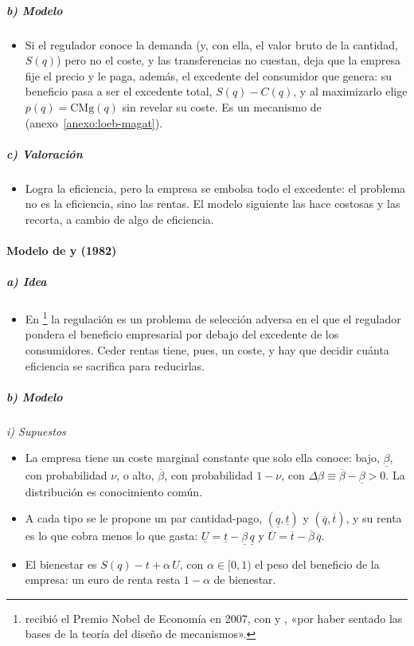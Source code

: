 \documentclass[11pt]{article}
\begin{document}
\subparagraph{b) Modelo}

\begin{itemize}
\item Si el regulador conoce la demanda (y, con ella, el valor bruto de la cantidad, $S(q)$) pero no el coste, y las transferencias no cuestan, deja que la empresa fije el precio y le paga, además, el excedente del consumidor que genera: su beneficio pasa a ser el excedente total, $S(q)-C(q)$, y al maximizarlo elige $p(q)=\mathrm{CMg}(q)$ sin revelar su coste. Es un mecanismo de   (anexo~\ref{anexo:loeb-magat}).
\end{itemize}

\subparagraph{c) Valoración}

\begin{itemize}
\item Logra la eficiencia, pero la empresa se embolsa todo el excedente: el problema no es la eficiencia, sino las rentas. El modelo siguiente las hace costosas y las recorta, a cambio de algo de eficiencia.
\end{itemize}

\paragraph{Modelo de  y  (1982)}

\subparagraph{a) Idea}

\begin{itemize}
\item En \textcite{BaronMyerson1982Regulating}\footnote{ recibió el Premio Nobel de Economía en 2007, con  y , «por haber sentado las bases de la teoría del diseño de mecanismos»\nocite{Nobel2007HurwiczMaskinMyerson}.} la regulación es un problema de selección adversa en el que el regulador pondera el beneficio empresarial por debajo del excedente de los consumidores. Ceder rentas tiene, pues, un coste, y hay que decidir cuánta eficiencia se sacrifica para reducirlas.
\end{itemize}

\subparagraph{b) Modelo}

\hspace*{3.6em}\emph{i) Supuestos}

\begin{itemize}
\item La empresa tiene un coste marginal constante que solo ella conoce: bajo, $\underline{\beta}$, con probabilidad $\nu$, o alto, $\overline{\beta}$, con probabilidad $1-\nu$, con $\Delta\beta\equiv\overline{\beta}-\underline{\beta}>0$. La distribución es conocimiento común.
\item A cada tipo se le propone un par cantidad-pago, $(\underline{q},\underline{t})$ y $(\overline{q},\overline{t})$, y su renta es lo que cobra menos lo que gasta: $\underline{U}=\underline{t}-\underline{\beta}\,\underline{q}$ y $\overline{U}=\overline{t}-\overline{\beta}\,\overline{q}$.
\item El bienestar es $S(q)-t+\alpha\,U$, con $\alpha\in[0,1)$ el peso del beneficio de la empresa: un euro de renta resta $1-\alpha$ de bienestar.
\end{itemize}
\end{document}
